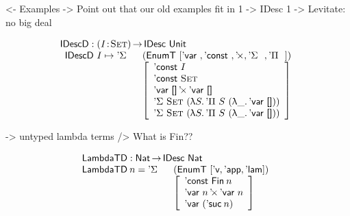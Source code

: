 \documentclass[preprint, authoryear, onecolumn]{sigplanconf}
\newenvironment{structure}{\footnotesize\verbatim}{\endverbatim}
\begin{document}
\begin{structure}
<- Examples
    -> Point out that our old examples fit in 1 -> IDesc 1
    -> Levitate: no big deal
\end{structure}

\[\stk{
\IDescD : \PI{\V{I}}{\Set} \IDesc{\Unit} \\
\begin{array}{ll}
\IDescD~I \mapsto \DSigma{}{} & (\EnumT [ \DVar{},
\DConst{},
                                                                                    \DProd{}{},
                                          \DSigma{}{}, 
                                          \DPi{}{} ]) \\
                              & \left[\begin{array}{l}
                                      \DConst{I}                  \\
                                      \DConst{\Set}               \\
                                      \DProd{\DVar{\Void}}{\DVar{\Void}}  \\
                                      \DSigma{\Set}{(\LAM{S} \DPi{S}{(\LAM{\_} \DVar{\Void})})} \\
                                      \DSigma{\Set}{(\LAM{S} \DPi{S}{(\LAM{\_} \DVar{\Void})})}
                                   \end{array}
                             \right]
\end{array}
}\]

\begin{structure}
    -> untyped lambda terms
        /> What is Fin??
\end{structure}

\[\stk{
\LambdaTD : \Nat \To \IDesc{\Nat} \\
\begin{array}{@{}ll}
\LambdaTD\: n = \DSigma{}{} & (\EnumT [ \LambdaTVar, \LambdaTApp, \LambdaTLam ]) \\
                            & \left[\begin{array}{l}
                                  \DConst{\Fin{n}} \\
                                  \DProd{\DVar{n}}{\DVar{n}} \\
                                  \DVar{(\NatSuc{n})}
                              \end{array}\right]
\end{array}
}\]
\end{document}
